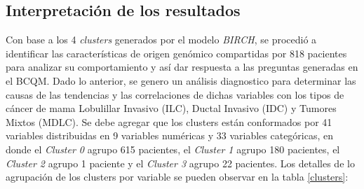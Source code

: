 \subsection{Interpretación de los resultados}
Con base a los 4 \textit{clusters} generados por el modelo \textit{BIRCH}, se procedió a identificar las características de origen genómico compartidas por 818 pacientes para analizar su comportamiento y así dar respuesta a las preguntas generadas en el BCQM. Dado lo anterior, se genero un análisis diagnostico para determinar las causas de las tendencias y las correlaciones de dichas variables con los tipos de cáncer de mama Lobulillar Invasivo (ILC), Ductal Invasivo (IDC) y Tumores Mixtos (MDLC). Se debe agregar que los clusters están conformados por 41 variables distribuidas en 9 variables numéricas y 33 variables categóricas, en donde el \textit{Cluster 0} agrupo 615 pacientes, el \textit{Cluster 1} agrupo 180 pacientes, el \textit{Cluster 2} agrupo 1 paciente y el \textit{Cluster 3} agrupo 22 pacientes. Los detalles de lo agrupación de los clusters por variable se pueden observar en la tabla \ref{clusters}:
